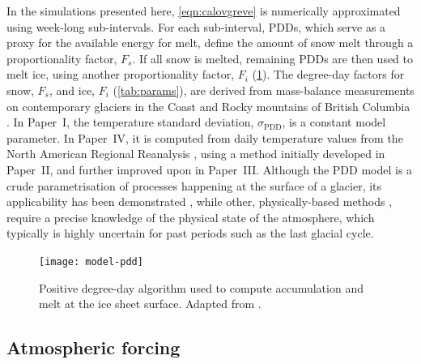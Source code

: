 \documentclass[a4paper]{kappa}
\newcommand{\sPDD}[0]{\sigma_{\mathrm{PDD}}}
\newcommand{\CCLI}[0]{Paper~I}      %
\newcommand{\PSDV}[0]{Paper~II}     %
\newcommand{\PSDP}[0]{Paper~III}    %
\newcommand{\CCYC}[0]{Paper~IV}     %
\begin{document}
In the simulations presented here, \cref{eqn:calovgreve} is numerically
approximated using week-long sub-intervals. For each sub-interval, PDDs, which
serve as a proxy for the available energy for melt, define the amount of snow
melt through a proportionality factor, $F_s$. If all snow is melted, remaining
PDDs are then used to melt ice, using another proportionality factor, $F_i$
(\cref{fig:model-pdd}). The degree-day factors for snow, $F_s$, and ice, $F_i$
(\cref{tab:params}),
are derived from mass-balance measurements on contemporary glaciers in the
Coast and Rocky mountains of British Columbia \citep{Shea.etal.2009}. In
{\CCLI}, the temperature standard deviation, $\sPDD$, is a constant model
parameter. In {\CCYC}, it is computed from daily temperature values from the
North American Regional Reanalysis \citep[NARR,][]{Mesinger.etal.2006}, using
a method initially developed in {\PSDV}, and further improved upon in {\PSDP}.
Although the PDD model is a crude parametrisation of processes happening at the
surface of a glacier, its applicability has been demonstrated
\citep[e.g.][]{Hock.2003},
while other, physically-based methods \citep[e.g.][]{Hock.2005}, require a
precise knowledge of the physical state of the atmosphere, which typically is highly
uncertain for past periods such as the last glacial cycle.

\begin{figure}
  \texttt{[image: model-pdd]}
  \caption{Positive degree-day algorithm used to compute accumulation and melt
           at the ice sheet surface. Adapted from \citet{PISM-authors.2014}.}
  \label{fig:model-pdd}
\end{figure}


\subsection{Atmospheric forcing}
\label{sec:atm}
\end{document}
